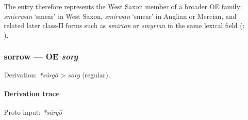\documentclass[
  british,
  a4paper,
]{article}
\begin{document}
The entry therefore represents the West Saxon member of a broader OE
family: {\emph{smierwan}} `smear' in West Saxon, {\emph{smirwan}}
`smear' in Anglian or Mercian, and related later class-II forms such as
\emph{smirian} or \emph{smyrian} in the same lexical field
(;
).

\subsubsection{\texorpdfstring{sorrow --- OE
\emph{sorg}}{sorrow --- OE sorg}}\label{sorrow-oe-sorg}

Derivation: \emph{*súrgō} \textgreater{} \emph{sorg} (regular).

\paragraph{Derivation trace}\label{derivation-trace-72}

Proto input: \emph{*súrgō}

\begingroup
\setlength{\fboxsep}{6pt}
\end{document}
